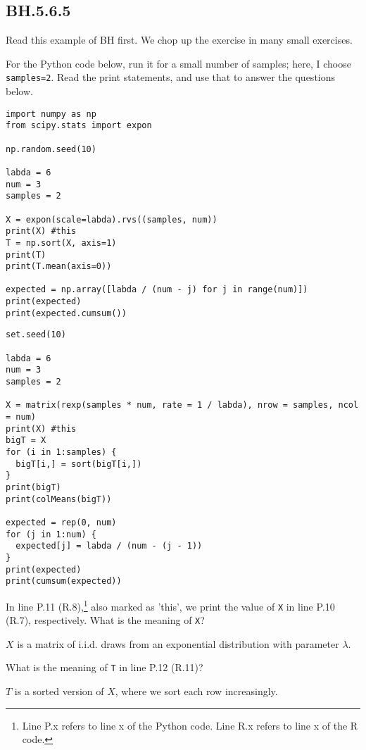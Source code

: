 \subsection{BH.5.6.5}
Read this example of BH first.
We chop up the exercise in many small exercises.


For the Python code below, run it for a small number of samples; here, I choose \texttt{samples=2}. Read the print statements, and use that to answer the questions below.

\begin{verbatim}
import numpy as np
from scipy.stats import expon

np.random.seed(10)

labda = 6
num = 3
samples = 2

X = expon(scale=labda).rvs((samples, num))
print(X) #this
T = np.sort(X, axis=1)
print(T)
print(T.mean(axis=0))

expected = np.array([labda / (num - j) for j in range(num)])
print(expected)
print(expected.cumsum())
\end{verbatim}


\begin{verbatim}
set.seed(10)

labda = 6
num = 3
samples = 2

X = matrix(rexp(samples * num, rate = 1 / labda), nrow = samples, ncol = num)
print(X) #this
bigT = X
for (i in 1:samples) {
  bigT[i,] = sort(bigT[i,])
}
print(bigT)
print(colMeans(bigT))

expected = rep(0, num)
for (j in 1:num) {
  expected[j] = labda / (num - (j - 1))
}
print(expected)
print(cumsum(expected))
\end{verbatim}



\begin{exercise}
In line P.11 (R.8),\footnote{Line P.x refers to line x of the Python code.
  Line R.x refers to line x of the R code.}
also marked as 'this', we print the value of \texttt{X} in line P.10 (R.7), respectively.
What is the meaning of \texttt{X}?
\begin{solution}
$X$ is a matrix of i.i.d. draws from an exponential distribution with parameter $\lambda$.
\end{solution}
\end{exercise}

\begin{exercise}
What is the meaning of \texttt{T} in line P.12 (R.11)?
\begin{solution}
$T$ is a sorted version of $X$, where we sort each row increasingly.
\end{solution}
\end{exercise}


